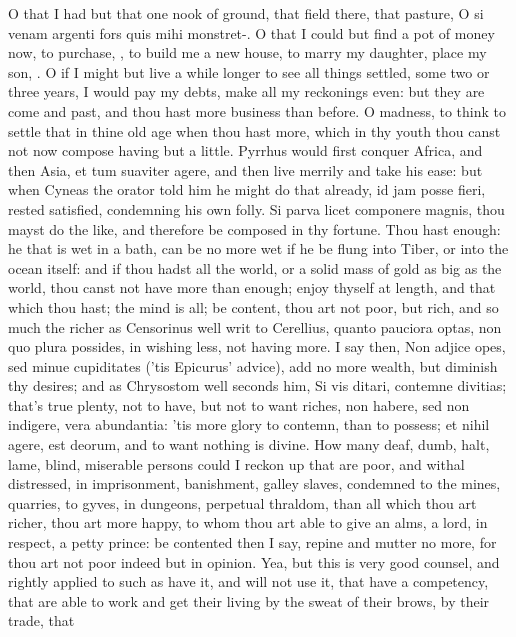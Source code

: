 {O that I had but that one nook of ground, that field there, that
pasture, O si venam argenti fors quis mihi monstret-. O that I could
but find a pot of money now, to purchase, \etc{}, to build me a new house,
to marry my daughter, place my son, \etc{}. O if I might but live a
while longer to see all things settled, some two or three years, I
would pay my debts, make all my reckonings even: but they are come and
past, and thou hast more business than before. O madness, to think to
settle that in thine old age when thou hast more, which in thy youth
thou canst not now compose having but a little. Pyrrhus would
first conquer Africa, and then Asia, et tum suaviter agere, and then
live merrily and take his ease: but when Cyneas the orator told him he
might do that already, id jam posse fieri, rested satisfied, condemning
his own folly. Si parva licet componere magnis, thou mayst do the like,
and therefore be composed in thy fortune. Thou hast enough: he that is
wet in a bath, can be no more wet if he be flung into Tiber, or into
the ocean itself: and if thou hadst all the world, or a solid mass of
gold as big as the world, thou canst not have more than enough; enjoy
thyself at length, and that which thou hast; the mind is all; be
content, thou art not poor, but rich, and so much the richer as
Censorinus well writ to Cerellius, quanto pauciora optas, non quo
plura possides, in wishing less, not having more. I say then, Non
adjice opes, sed minue cupiditates ('tis Epicurus' advice), add
no more wealth, but diminish thy desires; and as Chrysostom well
seconds him, Si vis ditari, contemne divitias; that's true plenty, not
to have, but not to want riches, non habere, sed non indigere, vera
abundantia: 'tis more glory to contemn, than to possess; et nihil
agere, est deorum, and to want nothing is divine. How many deaf, dumb,
halt, lame, blind, miserable persons could I reckon up that are poor,
and withal distressed, in imprisonment, banishment, galley slaves,
condemned to the mines, quarries, to gyves, in dungeons, perpetual
thraldom, than all which thou art richer, thou art more happy, to whom
thou art able to give an alms, a lord, in respect, a petty prince:
be contented then I say, repine and mutter no more, for thou art
not poor indeed but in opinion.
Yea, but this is very good counsel, and rightly applied to such as have
it, and will not use it, that have a competency, that are able to work
and get their living by the sweat of their brows, by their trade, that
}

